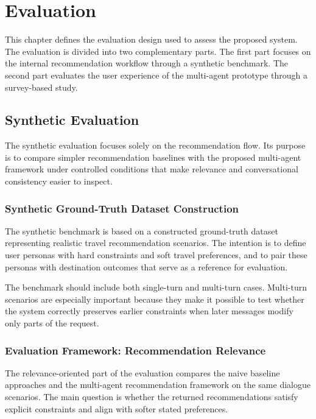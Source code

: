 
\chapter{Evaluation}\label{chapter:evaluation}

This chapter defines the evaluation design used to assess the proposed system. The evaluation is divided into two complementary parts. The first part focuses on the internal recommendation workflow through a synthetic benchmark. The second part evaluates the user experience of the multi-agent prototype through a survey-based study.

\section{Synthetic Evaluation}\label{section:evaluation:synthetic}
The synthetic evaluation focuses solely on the recommendation flow. Its purpose is to compare simpler recommendation baselines with the proposed multi-agent framework under controlled conditions that make relevance and conversational consistency easier to inspect.

\subsection{Synthetic Ground-Truth Dataset Construction}\label{subsection:evaluation:ground-truth}
The synthetic benchmark is based on a constructed ground-truth dataset representing realistic travel recommendation scenarios. The intention is to define user personas with hard constraints and soft travel preferences, and to pair these personas with destination outcomes that serve as a reference for evaluation.

The benchmark should include both single-turn and multi-turn cases. Multi-turn scenarios are especially important because they make it possible to test whether the system correctly preserves earlier constraints when later messages modify only parts of the request.


\subsection{Evaluation Framework: Recommendation Relevance}\label{subsection:evaluation:relevance}
The relevance-oriented part of the evaluation compares the naive baseline approaches and the multi-agent recommendation framework on the same dialogue scenarios. The main question is whether the returned recommendations satisfy explicit constraints and align with softer stated preferences.

